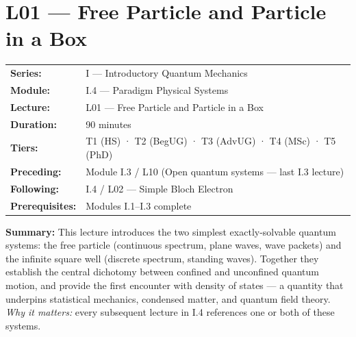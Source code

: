 \renewcommand{\lectureCode}{I.4 / L01}

\section*{L01 — Free Particle and Particle in a Box}
\label{sec:L01}

\begin{tcolorbox}[lecturebox, title={Module I.4 / L01 — Metadata}]
\begin{tabular}{@{}ll@{}}
\textbf{Series:}    & I — Introductory Quantum Mechanics \\
\textbf{Module:}    & I.4 — Paradigm Physical Systems \\
\textbf{Lecture:}   & L01 — Free Particle and Particle in a Box \\
\textbf{Duration:}  & 90 minutes \\
\textbf{Tiers:}     & T1 (HS) · T2 (BegUG) · T3 (AdvUG) · T4 (MSc) · T5 (PhD) \\
\textbf{Preceding:} & Module I.3 / L10 (Open quantum systems — last I.3 lecture) \\
\textbf{Following:} & I.4 / L02 — Simple Bloch Electron \\
\textbf{Prerequisites:} & Modules I.1–I.3 complete \\
\end{tabular}

\medskip
\textbf{Summary:}
This lecture introduces the two simplest exactly-solvable quantum systems: the free
particle (continuous spectrum, plane waves, wave packets) and the infinite square well
(discrete spectrum, standing waves). Together they establish the central dichotomy
between confined and unconfined quantum motion, and provide the first encounter with
density of states — a quantity that underpins statistical mechanics, condensed matter,
and quantum field theory. \textit{Why it matters:} every subsequent lecture in I.4
references one or both of these systems.
\end{tcolorbox}

